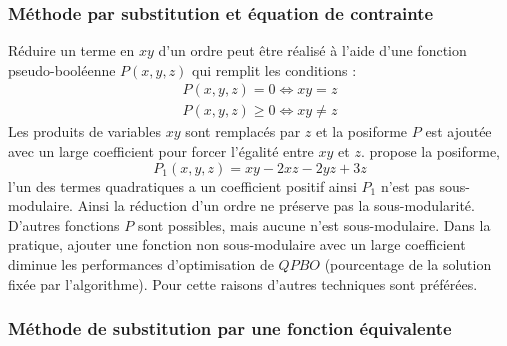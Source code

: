 \documentclass[../main/These_Mathias_Paget.tex]{subfiles}
\begin{document}
\subsubsection{Méthode par substitution et équation de contrainte}

Réduire un terme en $xy$ d'un ordre peut être réalisé à l'aide d'une fonction pseudo-booléenne $P(x,y,z)$ qui remplit les conditions :
\begin{align}
P(x,y,z)=0 \iff xy=z \\
P(x,y,z)\geq 0 \iff xy \neq z
\end{align}
Les produits de variables $xy$ sont remplacés par $z$ et la posiforme $P$ est ajoutée avec un large coefficient pour forcer l'égalité entre $xy$ et $z$. \cite{Boros02DAM} propose la posiforme,
\begin{equation}
P_1(x,y,z)= xy-2xz-2yz+3z
\end{equation}
l'un des termes quadratiques a un coefficient positif ainsi $P_1$ n'est pas sous-modulaire. Ainsi la réduction d'un ordre ne préserve pas la sous-modularité. D'autres fonctions $P$ sont possibles, mais aucune n'est sous-modulaire. Dans la pratique, ajouter une fonction non sous-modulaire avec un large coefficient diminue les performances d'optimisation de $QPBO$ (pourcentage de la solution fixée par l'algorithme). Pour cette raisons d'autres techniques sont préférées.

\subsubsection{Méthode de substitution par une fonction équivalente}
\end{document}
